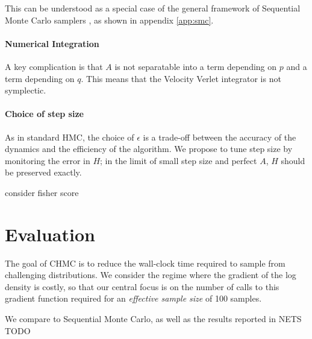 \documentclass{article}
\begin{document}
This can be understood as a special case of the general framework of Sequential Monte Carlo samplers \cite{doucet2001sequential}, as shown in appendix \ref{app:smc}.

\paragraph{Numerical Integration} A key complication is that $A$ is not separatable into a term depending on $p$ and a term depending on $q$. This means that the Velocity Verlet integrator is not symplectic.








\paragraph{Choice of step size} As in standard HMC, the choice of $\epsilon$ is a trade-off between the accuracy of the dynamics and the efficiency of the algorithm. We propose to tune step size by monitoring the error in $H$; in the limit of small step size and perfect $A$, $H$ should be preserved exactly. 

consider fisher score

\section{Evaluation}

The goal of CHMC is to reduce the wall-clock time required to sample from challenging distributions. We consider the regime where the gradient of the log density is costly, so that our central focus is on the number of calls to this gradient function required for an \emph{effective sample size} of 100 samples.

We compare to Sequential Monte Carlo, as well as the results reported in NETS TODO 
\end{document}
